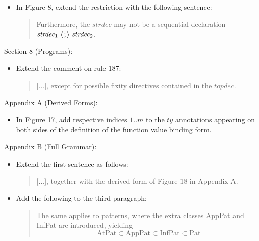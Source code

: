 \documentclass[twoside,titlepage]{article}
\begin{document}
\begin{appendix}
\begin{itemize}
\item In Figure 8, extend the restriction with the following sentence:
  \begin{quote}
  Furthermore, the $\mathit{strdec}$ may not be a sequential declaration $\mathit{strdec}_1~\langle\mbox{\tt;}\rangle~\mathit{strdec}_2$.
  \end{quote}
\end{itemize}

Section 8 (Programs):
\begin{itemize}
\item Extend the comment on rule 187:
  \begin{quote}
 [...], except for possible fixity directives contained in the $\mathit{topdec}$.
  \end{quote}
\end{itemize}

Appendix A (Derived Forms):
\begin{itemize}
\item In Figure 17, add respective indices $1..m$ to the $\mathit{ty}$ annotations appearing on both sides of the definition of the function value binding form.
\end{itemize}

Appendix B (Full Grammar):
\begin{itemize}
\item Extend the first sentence as follows: 
  \begin{quote}
 [...], together with the derived form of Figure 18 in Appendix A.
  \end{quote}

\item Add the following to the third paragraph:
  \begin{quote}
  The same applies to patterns, where the extra classes AppPat and InfPat are introduced, yielding
  $$
  \mbox{AtPat} \subset \mbox{AppPat} \subset \mbox{InfPat} \subset \mbox{Pat}
  $$
  \end{quote}


\end{itemize}
\end{appendix}
\end{document}
